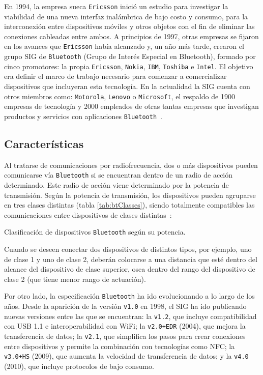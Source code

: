 En 1994, la empresa sueca \texttt{Ericsson} inició un estudio para investigar
la viabilidad de una nueva interfaz inalámbrica de bajo costo y consumo, para
la interconexión entre dispositivos móviles y otros objetos con el fin de
eliminar las conexiones cableadas entre ambos. A principios
de 1997, otras empresas se fijaron en los avances que \texttt{Ericsson} había
alcanzado y, un año más tarde, crearon el grupo \acs{SIG} de \texttt{Bluetooth}
(Grupo de Interés Especial en Bluetooth), formado por cinco promotores:
la propia \texttt{Ericsson}, \texttt{Nokia}, \texttt{IBM}, \texttt{Toshiba} e
\texttt{Intel}. El objetivo era definir el marco de trabajo necesario para
comenzar a comercializar dispositivos que incluyeran esta tecnología.
En la actualidad la \acs{SIG} cuenta con otros miembros como:
\texttt{Motorola}, \texttt{Lenovo} o \texttt{Microsoft}, el
respaldo de 1900 empresas de tecnología y 2000 empleados de otras tantas
empresas que investigan productos y servicios con aplicaciones
\texttt{Bluetooth}~\cite{bib:btDefinition}.

  \subsection{Características}
Al tratarse de comunicaciones por radiofrecuencia, dos o más dispositivos
pueden comunicarse vía \texttt{Bluetooth} si se encuentran dentro de un radio de
acción determinado. Este radio de acción viene determinado por la potencia de
transmisión. Según la potencia de transmisión, los dispositivos pueden
agruparse en tres clases distintas (tabla \ref{tab:btClasses}), siendo
totalmente compatibles las comunicaciones entre dispositivos
de clases distintas~\cite{bib:btDefinition}:

\begin{table}[H]
  \centering
  \caption[Clasificación de dispositivos \texttt{Bluetooth} según su potencia.]
  {Clasificación de dispositivos \texttt{Bluetooth} según su potencia.}
  \label{tab:btClasses}
  {\normalsize
  
  }  
\end{table}

Cuando se deseen conectar dos dispositivos de distintos tipos, por ejemplo,
uno de clase 1 y uno de clase 2, deberán colocarse a una distancia que esté
dentro del alcance del dispositivo de clase superior, osea dentro del
rango del dispositivo de clase 2 (que tiene menor rango de actuación).

Por otro lado, la especificación \texttt{Bluetooth} ha ido evolucionando a lo
largo de los años. Desde la aparición de la versión \texttt{v1.0} en 1998,
el \acs{SIG} ha ido publicando nuevas versiones entre las que se encuentran:
la \texttt{v1.2}, que incluye compatibilidad con \acs{USB} 1.1 e 
interoperabilidad con \acs{WiFi}; la \texttt{v2.0+EDR} (2004), que mejora la 
transferencia de datos; la \texttt{v2.1}, que simplifica los pasos para crear 
conexiones entre dispositivos y permite la combinación con tecnologías como
\acs{NFC}; la \texttt{v3.0+HS} (2009), que aumenta la velocidad de
transferencia de datos; y la \texttt{v4.0} (2010), que incluye protocolos de
bajo consumo.

